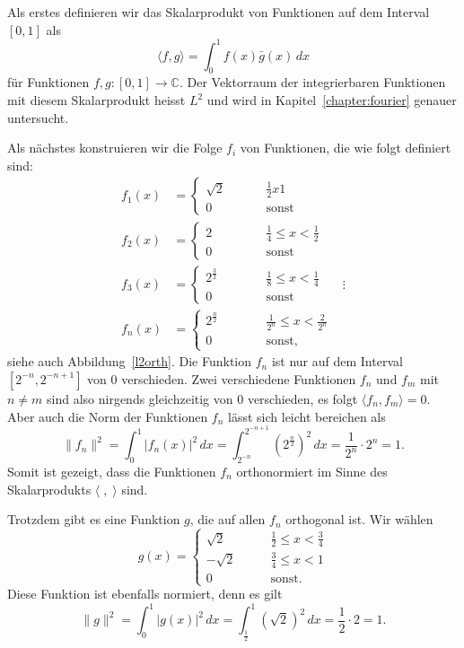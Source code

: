 \begin{beispiel}
Als erstes definieren wir das Skalarprodukt von Funktionen auf dem
Interval $[0,1]$ als
\[
\langle f, g\rangle
=
\int_0^1 f(x) \bar{g}(x)\,dx
\]
für Funktionen $f,g\colon [0,1]\to\mathbb C$.
Der Vektorraum der integrierbaren Funktionen mit diesem Skalarprodukt
heisst $L^2$ und wird in Kapitel~\ref{chapter:fourier} genauer untersucht.

Als nächstes konstruieren wir die Folge $f_i$ von Funktionen, die wie
folgt definiert sind:
\begin{align*}
f_1(x) &= \begin{cases}
\sqrt{2}&\qquad \frac12x1\\
0\phantom{000}&\qquad\text{sonst}
\end{cases}
\\
f_2(x) &= \begin{cases}
2&\qquad \frac14 \le x < \frac12\\
0\phantom{000}&\qquad\text{sonst}
\end{cases}
\\
f_3(x) &= \begin{cases}
2^{\frac32}&\qquad \frac18 \le x < \frac14\\
0\phantom{000}&\qquad\text{sonst}
\end{cases}
&\vdots\\
f_n(x) &= \begin{cases}
2^{\frac{n}2}&\qquad \frac1{2^n} \le x < \frac2{2^n}\\
0\phantom{000}&\qquad\text{sonst,}
\end{cases}
\end{align*}
siehe auch Abbildung~\ref{l2orth}.
Die Funktion $f_n$ ist nur auf dem Interval $[2^{-n},2^{-n+1}]$ von
$0$ verschieden.
Zwei verschiedene Funktionen $f_n$ und $f_m$ mit $n\ne m$ sind also
nirgends gleichzeitig von $0$ verschieden, es folgt
$\langle f_n,f_m\rangle =0$.
Aber auch die Norm der Funktionen $f_n$ lässt sich leicht bereichen
als
\[
\|f_n\|^2
=
\int_0^1 |f_n(x)|^2\,dx
=
\int_{2^{-n}}^{2^{-n+1}} (2^{\frac{n}2})^2 \,dx
=
\frac1{2^n}\cdot 2^n = 1.
\]
Somit ist gezeigt, dass die Funktionen $f_n$ orthonormiert im Sinne des
Skalarprodukts $\langle\;,\;\rangle$ sind.

Trotzdem gibt es eine Funktion $g$, die auf allen $f_n$ orthogonal ist.
Wir wählen
\[
g(x) = \begin{cases}
\sqrt{2}&\qquad \frac12 \le x < \frac34\\
-\sqrt{2}&\qquad \frac34 \le x < 1\\
0&\qquad\text{sonst.}
\end{cases}
\]
Diese Funktion ist ebenfalls normiert, denn es gilt
\[
\|g\|^2
=
\int_0^1 |g(x)|^2 \,dx
=
\int_{\frac12}^1 (\sqrt{2})^2\,dx
=
\frac12\cdot 2 = 1.
\]


\end{beispiel}
